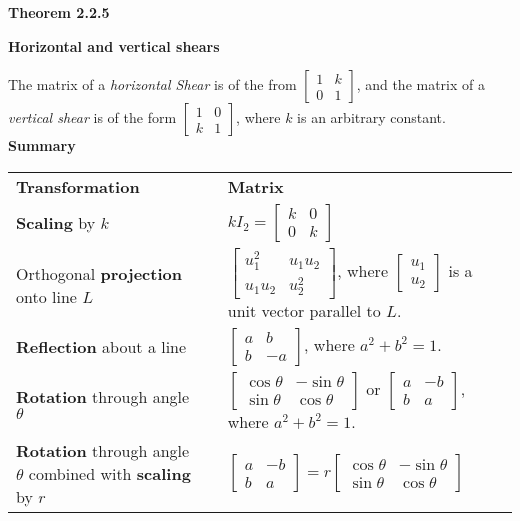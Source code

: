 \textbf{Theorem 2.2.5}\\
\par\noindent\textbf{Horizontal and vertical shears}
\par\noindent The matrix of a \textit{horizontal Shear} is of the from $\displaystyle\left[\begin{array}{cc}1&k\\ 0&1\end{array}\right]$, and the matrix of a \textit{vertical shear} is of the form $\displaystyle\left[\begin{array}{cc}1&0\\ k&1\end{array}\right]$, where $k$ is an arbitrary constant.\\
\textbf{Summary}\\
\begin{tabular}{lll}
\textbf{Transformation} & \qquad{} & \textbf{Matrix}\\
\textbf{Scaling} by $k$ & \qquad{} & $kI_{2}=\left[\begin{array}{cc}k&0\\ 0&k\end{array}\right]$\\
Orthogonal \textbf{projection} onto line $L$ & \qquad{} & $\left[\begin{array}{cc}u_{1}^{2}&u_{1}u_{2}\\ u_{1}u_{2}&u_{2}^{2}\end{array}\right]$, where $\left[\begin{array}{c}u_{1}\\ u_{2}\end{array}\right]$ is a unit vector parallel to $L$.\\
\textbf{Reflection} about a line & \qquad{} & $\left[\begin{array}{cc}a&b\\ b&-a\end{array}\right]$, where $a^{2}+b^{2}=1$.\\
\textbf{Rotation} through angle $\theta$ & \qquad{} & $\left[\begin{array}{cc}\cos\theta{}&-\sin\theta{}\\ \sin\theta{}&\cos\theta{}\end{array}\right]$ or $\left[\begin{array}{cc}a&-b\\ b&a\end{array}\right]$, where $a^{2}+b^{2}=1$.\\
\textbf{Rotation} through angle $\theta$ combined with \textbf{scaling} by $r$  & \qquad{} & $\left[\begin{array}{cc}a&-b\\ b&a\end{array}\right]=r\left[\begin{array}{cc}\cos\theta{}&-\sin\theta{}\\ \sin\theta{}&\cos\theta{}\end{array}\right]$\\

\end{tabular}
